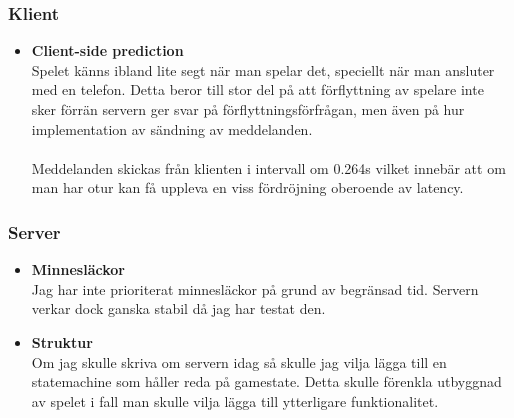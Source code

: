 \documentclass[10pt, titlepage, oneside, a4paper]{article}
\begin{document}
    		\subsubsection{Klient}
    			\begin{itemize}
    				\item\textbf{Client-side prediction}\\Spelet känns ibland lite segt när man spelar det, speciellt när man ansluter med en telefon. Detta beror till stor del på att förflyttning av spelare inte sker förrän servern ger svar på förflyttningsförfrågan, men även på hur implementation av sändning av meddelanden.\\\\Meddelanden skickas från klienten i intervall om 0.264s vilket innebär att om man har otur kan få uppleva en viss fördröjning oberoende av latency.
  					
    			\end{itemize}
    		\subsubsection{Server}
    			\begin{itemize}
    				\item\textbf{Minnesläckor}\\Jag har inte prioriterat minnesläckor på grund av begränsad tid. Servern verkar dock ganska stabil då jag har testat den. 
    				\item\textbf{Struktur}\\Om jag skulle skriva om servern idag så skulle jag vilja lägga till en statemachine som håller reda på gamestate. Detta skulle förenkla utbyggnad av spelet i fall man skulle vilja lägga till ytterligare funktionalitet. 
    			\end{itemize}
    		
\end{document}
